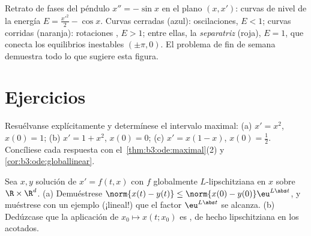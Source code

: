\begin{omfigure}

{\small Retrato de fases del péndulo $x'' = -\sin x$ en el plano
$(x, x')$: curvas de nivel de la energía $E = \frac{x'^2}2
- \cos x$. Curvas cerradas (azul): oscilaciones, $E < 1$; curvas
corridas (naranja): rotaciones , $E > 1$; entre ellas, la
\emph{separatriz} (roja), $E = 1$, que conecta los equilibrios
inestables $(\pm\pi, 0)$. El problema de fin de semana demuestra todo lo
que sugiere esta figura.}
\end{omfigure}

\section{Ejercicios}

\begin{exercise}[$\star$]\label{exo:b3:ode:1}
Resuélvanse explícitamente y determínese el intervalo maximal:
(a) $x' = x^2$, $x(0) = 1$; (b) $x' = 1 + x^2$, $x(0) = 0$;
(c) $x' = x(1-x)$, $x(0) = \frac12$. Concíliese cada respuesta con
el~\cref{thm:b3:ode:maximal}(2) y
\cref{cor:b3:ode:globallinear}.
\end{exercise}

\begin{exercise}[$\star$]\label{exo:b3:ode:2}
Sea $x, y$ solución de $x' = f(t,x)$ con $f$ globalmente
$L$-lipschitziana en $x$ sobre $\R\times\R^d$. (a) Demuéstrese
$\norm{x(t) - y(t)} \leq \norm{x(0) -
y(0)}\eu^{L\abs t}$, y muéstrese con un ejemplo (¡lineal!) que el factor
$\eu^{L\abs t}$ se alcanza. (b) Dedúzcase que la aplicación de
 $x_0 \mapsto x(t; x_0)$ es
, de hecho lipschitziana en
los acotados.
\end{exercise}

